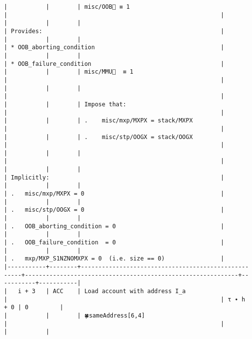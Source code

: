 \documentclass[varwidth=\maxdimen,margin=0.5cm,multi={verbatim}]{standalone}
\begin{document}
\begin{verbatim}
|           |        | misc/OOB🚩 ≡ 1                                      |                                                             |
|           |        |                                                     | Provides:                                                   |
|           |        |                                                     | * OOB_aborting_condition                                    |
|           |        |                                                     | * OOB_failure_condition                                     |
|           |        | misc/MMU🚩  ≡ 1                                     |                                                             |
|           |        |                                                     |                                                             |
|           |        | Impose that:                                        |                                                             |
|           |        | .    misc/mxp/MXPX = stack/MXPX                     |                                                             |
|           |        | .    misc/stp/OOGX = stack/OOGX                     |                                                             |
|           |        |                                                     |                                                             |
|           |        |                                                     | Implicitly:                                                 |
|           |        |                                                     | .   misc/mxp/MXPX = 0                                       |
|           |        |                                                     | .   misc/stp/OOGX = 0                                       |
|           |        |                                                     | .   OOB_aborting_condition = 0                              |
|           |        |                                                     | .   OOB_failure_condition  = 0                              |
|           |        |                                                     | .   mxp/MXP_S1NZNOMXPX = 0  (i.e. size == 0)                |
|-----------+--------+-----------------------------------------------------+-------------------------------------------------------------+-----------+-----------|
|   i + 3   | ACC    | Load account with address I_a                       |                                                             | τ ∙ h + 0 | 0         |
|           |        | 🍀sameAddress[6,4]                                  |                                                             |           |           |

\end{verbatim}
\end{document}
